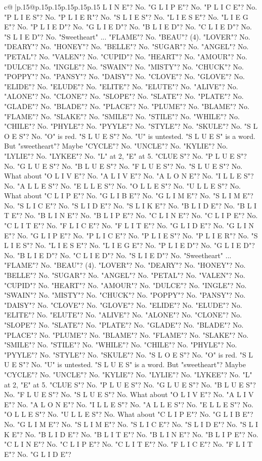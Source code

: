 \documentclass{article}
\begin{document}
{\begin{supertabular}{c@{$\;$}|p{.15\linewidth}@{}p{.15\linewidth}p{.15\linewidth}p{.15\linewidth}p{.15\linewidth}p{.15\linewidth}}
{{{L I N E"? No. "G L I P E"? No. "P L I C E"? No. "P L I E S"? No. "P L I E R"? No. "S L I E S"? No. "L I E S E"? No. "L I E G E"? No. "P L I E D"? No. "G L I E D"? No. "B L I E D"? No. "C L I E D"? No. "S L I E D"? No. "Sweetheart" ... "FLAME"? No. "BEAU"? (4). "LOVER"? No. "DEARY"? No. "HONEY"? No. "BELLE"? No. "SUGAR"? No. "ANGEL"? No. "PETAL"? No. "VALEN"? No. "CUPID"? No. "HEART"? No. "AMOUR"? No. "DULCE"? No. "INGLE"? No. "SWAIN"? No. "MISTY"? No. "CHUCK"? No. "POPPY"? No. "PANSY"? No. "DAISY"? No. "CLOVE"? No. "GLOVE"? No. "ELIDE"? No. "ELUDE"? No. "ELITE"? No. "ELUTE"? No. "ALIVE"? No. "ALONE"? No. "CLONE"? No. "SLOPE"? No. "SLATE"? No. "PLATE"? No. "GLADE"? No. "BLADE"? No. "PLACE"? No. "PLUME"? No. "BLAME"? No. "FLAME"? No. "SLAKE"? No. "SMILE"? No. "STILE"? No. "WHILE"? No. "CHILE"? No. "PHYLE"? No. "PYYLE"? No. "STYLE"? No. "SKULE"? No. "S L O E S"? No. "O" is red. "S L U E S"? No. "U" is untested. "S L U E S" is a word. But "sweetheart"? Maybe "CYCLE"? No. "UNCLE"? No. "KYLIE"? No. "LYLIE"? No. "LYKEE"? No. "L" at 2, "E" at 5. "CLUE S"? No. "P L U E S"? No. "G L U E S"? No. "B L U E S"? No. "F L U E S"? No. "S L U E S"? No. What about "O L I V E"? No. "A L I V E"? No. "A L O N E"? No. "I L L E S"? No. "A L L E S"? No. "E L L E S"? No. "O L L E S"? No. "U L L E S"? No. What about "C L I P E"? No. "G L I B E"? No. "G L I M E"? No. "S L I M E"? No. "S L I C E"? No. "S L I D E"? No. "S L I K E"? No. "B L I D E"? No. "B L I T E"? No. "B L I N E"? No. "B L I P E"? No. "C L I N E"? No. "C L I P E"? No. "C L I T E"? No. "F L I C E"? No. "F L I T E"? No. "G L I D E"? No. "G L I N E"? No. "G L I P E"? No. "P L I C E"? No. "P L I E S"? No. "P L I E R"? No. "S L I E S"? No. "L I E S E"? No. "L I E G E"? No. "P L I E D"? No. "G L I E D"? No. "B L I E D"? No. "C L I E D"? No. "S L I E D"? No. "Sweetheart" ... "FLAME"? No. "BEAU"? (4). "LOVER"? No. "DEARY"? No. "HONEY"? No. "BELLE"? No. "SUGAR"? No. "ANGEL"? No. "PETAL"? No. "VALEN"? No. "CUPID"? No. "HEART"? No. "AMOUR"? No. "DULCE"? No. "INGLE"? No. "SWAIN"? No. "MISTY"? No. "CHUCK"? No. "POPPY"? No. "PANSY"? No. "DAISY"? No. "CLOVE"? No. "GLOVE"? No. "ELIDE"? No. "ELUDE"? No. "ELITE"? No. "ELUTE"? No. "ALIVE"? No. "ALONE"? No. "CLONE"? No. "SLOPE"? No. "SLATE"? No. "PLATE"? No. "GLADE"? No. "BLADE"? No. "PLACE"? No. "PLUME"? No. "BLAME"? No. "FLAME"? No. "SLAKE"? No. "SMILE"? No. "STILE"? No. "WHILE"? No. "CHILE"? No. "PHYLE"? No. "PYYLE"? No. "STYLE"? No. "SKULE"? No. "S L O E S"? No. "O" is red. "S L U E S"? No. "U" is untested. "S L U E S" is a word. But "sweetheart"? Maybe "CYCLE"? No. "UNCLE"? No. "KYLIE"? No. "LYLIE"? No. "LYKEE"? No. "L" at 2, "E" at 5. "CLUE S"? No. "P L U E S"? No. "G L U E S"? No. "B L U E S"? No. "F L U E S"? No. "S L U E S"? No. What about "O L I V E"? No. "A L I V E"? No. "A L O N E"? No. "I L L E S"? No. "A L L E S"? No. "E L L E S"? No. "O L L E S"? No. "U L L E S"? No. What about "C L I P E"? No. "G L I B E"? No. "G L I M E"? No. "S L I M E"? No. "S L I C E"? No. "S L I D E"? No. "S L I K E"? No. "B L I D E"? No. "B L I T E"? No. "B L I N E"? No. "B L I P E"? No. "C L I N E"? No. "C L I P E"? No. "C L I T E"? No. "F L I C E"? No. "F L I T E"? No. "G L I D E"? }}}
\end{supertabular}}
\end{document}
